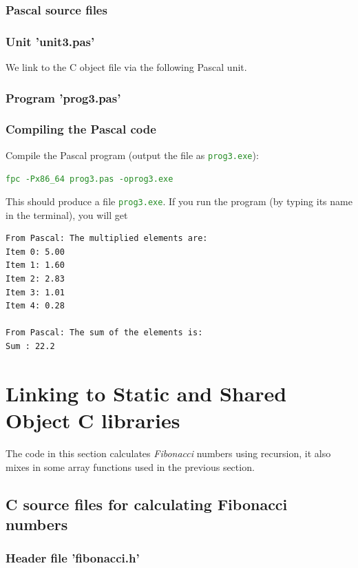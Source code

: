 \documentclass[10pt,a4paper]{article}
\newcommand{\mytext}[1]{\textcolor{ForestGreen}{\texttt{#1}}}
\begin{document}
\subsubsection{Pascal source files}
\lstset{style=myPascal}

\subsubsection*{Unit 'unit3.pas'}
We link to the C object file via the following Pascal unit.


\subsubsection*{Program 'prog3.pas'}


\subsubsection*{Compiling the Pascal code}
Compile the Pascal program (output the file as \mytext{prog3.exe}):

\mytext{fpc -Px86\_64 prog3.pas -oprog3.exe}

This should produce a file \mytext{prog3.exe}. If you run the program (by typing its name in the terminal), you will get

\lstset{style=myBash}
\begin{lstlisting}
From Pascal: The multiplied elements are:
Item 0: 5.00
Item 1: 1.60
Item 2: 2.83
Item 3: 1.01
Item 4: 0.28

From Pascal: The sum of the elements is:
Sum : 22.2
\end{lstlisting}
\clearpage

\section{Linking to Static and Shared Object C libraries}
The code in this section calculates \textit{Fibonacci} numbers using recursion,
it also mixes
in some array functions used in the previous section.

\subsection{C source files for calculating Fibonacci numbers}
\lstset{style=myC}

\subsubsection*{Header file 'fibonacci.h'}

\end{document}
